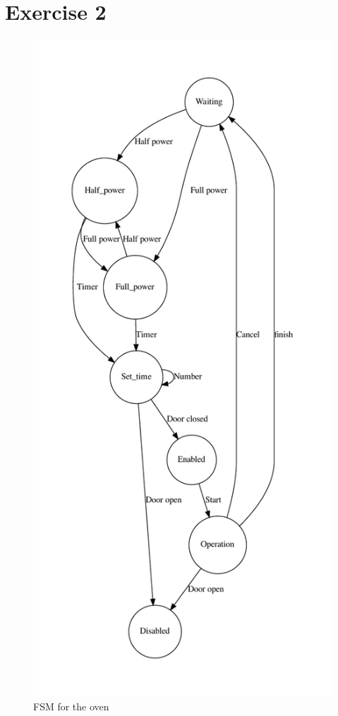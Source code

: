 \documentclass[12pt]{article}%
\begin{document}
\section*{Exercise 2}
\begin{figure}[]
    \centering
    \includegraphics[]{ovenfsm}
    \caption{FSM for the oven }
\end{figure}
\end{document}
